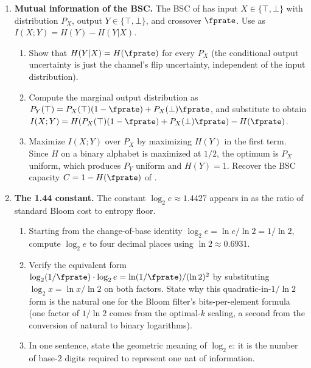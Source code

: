 \begin{enumerate}
\item \exstarstar
\label{ex:ch8-5}
\textbf{Mutual information of the BSC.}
The BSC of  has input $X \in \{\top, \bot\}$ with
distribution $P_X$, output $Y \in \{\top, \bot\}$, and crossover
$\fprate$. Use  as $I(X; Y) = H(Y) - H(Y |
X)$.
\begin{enumerate}
  \item[(a)] Show that $H(Y | X) = H(\fprate)$ for every $P_X$ (the
    conditional output uncertainty is just the channel's flip
    uncertainty, independent of the input distribution).
  \item[(b)] Compute the marginal output distribution as $P_Y(\top)
    = P_X(\top)(1 - \fprate) + P_X(\bot) \fprate$, and substitute
    to obtain $I(X; Y) = H(P_X(\top)(1 - \fprate) + P_X(\bot)
    \fprate) - H(\fprate)$.
  \item[(c)] Maximize $I(X; Y)$ over $P_X$ by maximizing $H(Y)$ in
    the first term. Since $H$ on a binary alphabet is maximized at
    $1/2$, the optimum is $P_X$ uniform, which produces $P_Y$
    uniform and $H(Y) = 1$. Recover the BSC capacity
    $C = 1 - H(\fprate)$ of .
\end{enumerate}

\item \exstarstar
\label{ex:ch8-6}
\textbf{The 1.44 constant.}
The constant $\log_2 e \approx 1.4427$ appears in
 as the ratio of standard Bloom cost to
entropy floor.
\begin{enumerate}
  \item[(a)] Starting from the change-of-base identity $\log_2 e =
    \ln e / \ln 2 = 1 / \ln 2$, compute $\log_2 e$ to four decimal
    places using $\ln 2 \approx 0.6931$.
  \item[(b)] Verify the equivalent form $\log_2(1/\fprate) \cdot
    \log_2 e = \ln(1/\fprate) / (\ln 2)^2$ by substituting
    $\log_2 x = \ln x / \ln 2$ on both factors. State why this
    quadratic-in-$1/\ln 2$ form is the natural one for the Bloom
    filter's bits-per-element formula (one factor of $1/\ln 2$
    comes from the optimal-$k$ scaling, a second from the
    conversion of natural to binary logarithms).
  \item[(c)] In one sentence, state the geometric meaning of
    $\log_2 e$: it is the number of base-$2$ digits required to
    represent one nat of information.
\end{enumerate}


\end{enumerate}
